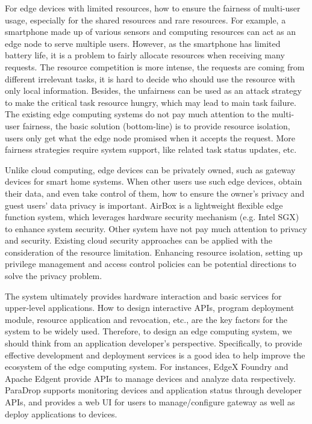 For edge devices with limited resources, how to ensure the fairness of multi-user usage, especially for the shared resources and rare resources. For example, a smartphone made up of various sensors and computing resources can act as an edge node to serve multiple users. However, as the smartphone has limited battery life, it is a problem to fairly allocate resources when receiving many requests. The resource competition is more intense, the requests are coming from different irrelevant tasks, it is hard to decide who should use the resource with only local information. Besides, the unfairness can be used as an attack strategy to make the critical task resource hungry, which may lead to main task failure. The existing edge computing systems do not pay much attention to the multi-user fairness, the basic solution (bottom-line) is to provide resource isolation, users only get what the edge node promised when it accepts the request. More fairness strategies require system support, like related task status updates, etc.

Unlike cloud computing, edge devices can be privately owned, such as gateway devices for smart home systems. When other users use such edge devices, obtain their data, and even take control of them, how to ensure the owner's privacy and guest users' data privacy is important. AirBox is a lightweight flexible edge function system, which leverages hardware security mechanism (e.g. Intel SGX) to enhance system security. Other system have not pay much attention to privacy and security. Existing cloud security approaches can be applied with the consideration of the resource limitation. Enhancing resource isolation, setting up privilege management and access control policies can be potential directions to solve the privacy problem.

The system ultimately provides hardware interaction and basic services for upper-level applications. How to design interactive APIs, program deployment module, resource application and revocation, etc., are the key factors for the system to be widely used. Therefore, to design an edge computing system, we should think from an application developer's perspective. Specifically, to provide effective development and deployment services is a good idea to help improve the ecosystem of the edge computing system. For instances, EdgeX Foundry and Apache Edgent provide APIs to manage devices and analyze data respectively. ParaDrop supports monitoring devices and application status through developer APIs, and provides a web UI for users to manage/configure gateway as well as deploy applications to devices.

